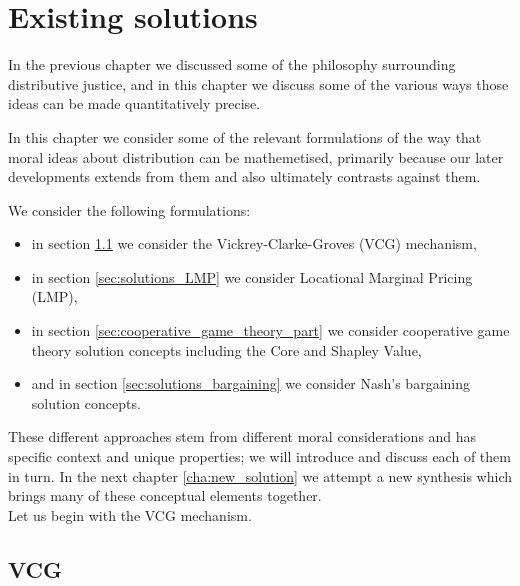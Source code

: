 \chapter{Existing solutions}
\label{cha:solutions}

In the previous chapter we discussed some of the philosophy surrounding distributive justice, and in this chapter we discuss some of the various ways those ideas can be made quantitatively precise.

In this chapter we consider some of the relevant formulations of the way that moral ideas about distribution can be mathemetised, primarily because our later developments extends from them and also ultimately contrasts against them.

We consider the following formulations:
\begin{itemize}
\item in section \ref{sec:solutions_VCG} we consider the Vickrey-Clarke-Groves (VCG) mechanism,
\item in section \ref{sec:solutions_LMP} we consider Locational Marginal Pricing (LMP),
\item in section \ref{sec:cooperative_game_theory_part} we consider cooperative game theory solution concepts including the Core and Shapley Value,
\item and in section \ref{sec:solutions_bargaining} we consider Nash's bargaining solution concepts.
\end{itemize}


These different approaches stem from different moral considerations and has specific context and unique properties; we will introduce and discuss each of them in turn.
In the next chapter \ref{cha:new_solution} we attempt a new synthesis which brings many of these conceptual elements together.\\
Let us begin with the VCG mechanism.

\section{VCG}\label{sec:solutions_VCG}


